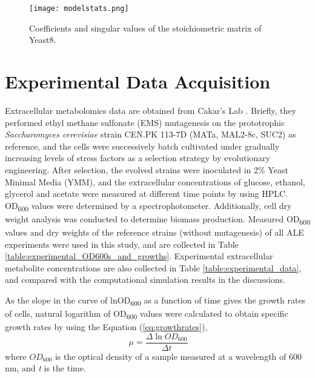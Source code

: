 \begin{figure}[H]
\begin{center}
\texttt{[image: modelstats.png]}
\end{center}
\caption[Coefficients and singular values of the stoichiometric matrix of Yeast8.]{Coefficients and singular values of the stoichiometric matrix of Yeast8.}
\label{fig:modelstats}
\end{figure}



\section{Experimental Data Acquisition} \label{experimentaldataacquisition}
Extracellular metabolomics data are obtained from Cakar's Lab \cite{arslan2018physiological}. Briefly, they performed ethyl methane sulfonate (EMS) mutagenesis on the prototrophic \emph{Saccharomyces cerevisiae} strain CEN.PK 113-7D (MATa, MAL2-8c, SUC2) as reference, and the cells were successively batch cultivated under gradually increasing levels of stress factors as a selection strategy by evolutionary engineering. After selection, the evolved strains were inoculated in 2\% Yeast Minimal Media (YMM), and the extracellular concentrations of glucose, ethanol, glycerol and acetate were measured at different time points by using HPLC. OD\textsubscript{600} values were determined by a spectrophotometer. Additionally, cell dry weight analysis was conducted to determine biomass production. Measured OD\textsubscript{600} values and dry weights of the reference strains (without mutagenesis) of all ALE experiments were used in this study, and are collected in Table \ref{table:experimental_OD600s_and_growths}. Experimental extracellular metabolite concentrations are also collected in Table \ref{table:experimental_data}, and compared with the computational simulation results in the discussions.
\vspace{0.5cm}




As the slope in the curve of lnOD\textsubscript{600} as a function of time gives the growth rates of cells, natural logarithm of OD\textsubscript{600} values were calculated to obtain specific growth rates by using the Equation (\ref{eq:growthrates}),
  \begin{equation}
      \ \mu = \frac{\Delta \ln{OD_{600}}}{\Delta t}
      \label{eq:growthrates}
  \end{equation}
where $OD_{600}$ is the optical density of a sample measured at a wavelength of 600 nm, and \emph{t} is the time.

